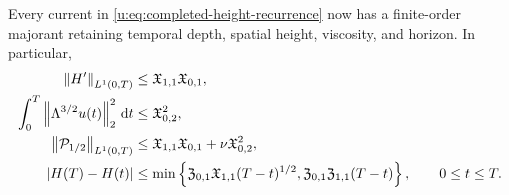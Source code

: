 {\begin{theorem}
Every current in \eqref{u:eq:completed-height-recurrence} now has a
finite-order majorant retaining temporal depth, spatial height, viscosity,
and horizon.
In particular,
\begin{align}
 \left\lVert H'\right\rVert_{L^1(0,T)}
 &\le\mathfrak X_{1,1}\mathfrak X_{0,1},
 \label{u:eq:qc-sharp-height-variation}\\
 \int_0^T\left\lVert \Lambda^{3/2}u(t)\right\rVert_2^2\,\mathrm d t
 &\le\mathfrak X_{0,2}^2,
 \label{u:eq:qc-sharp-critical-dissipation}\\
 \left\lVert \mathcal P_{1/2}\right\rVert_{L^1(0,T)}
 &\le\mathfrak X_{1,1}\mathfrak X_{0,1}
 +\nu\mathfrak X_{0,2}^2,
 \label{u:eq:qc-sharp-critical-current}\\
 |H(T)-H(t)|
 &\le\min\left\{
 \mathfrak Z_{0,1}\mathfrak X_{1,1}(T-t)^{1/2},
 \mathfrak Z_{0,1}\mathfrak Z_{1,1}(T-t)
 \right\},
 \qquad 0\le t\le T.
 \label{u:eq:qc-sharp-critical-modulus}
\end{align}


\end{theorem}}
